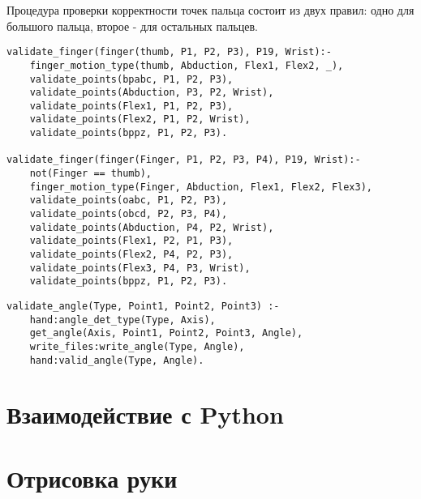 Процедура проверки корректности точек пальца состоит из двух правил: одно для большого пальца, второе - для остальных пальцев.
\begin{lstlisting}[caption=Процедура проверки корректности точек пальца, label=list:validate_finger]
validate_finger(finger(thumb, P1, P2, P3), P19, Wrist):-
	finger_motion_type(thumb, Abduction, Flex1, Flex2, _),
	validate_points(bpabc, P1, P2, P3),
	validate_points(Abduction, P3, P2, Wrist),
	validate_points(Flex1, P1, P2, P3),
	validate_points(Flex2, P1, P2, Wrist),
	validate_points(bppz, P1, P2, P3).
	
validate_finger(finger(Finger, P1, P2, P3, P4), P19, Wrist):-
	not(Finger == thumb),
	finger_motion_type(Finger, Abduction, Flex1, Flex2, Flex3),
	validate_points(oabc, P1, P2, P3),
	validate_points(obcd, P2, P3, P4),
	validate_points(Abduction, P4, P2, Wrist),
	validate_points(Flex1, P2, P1, P3),
	validate_points(Flex2, P4, P2, P3),
	validate_points(Flex3, P4, P3, Wrist),
	validate_points(bppz, P1, P2, P3).
\end{lstlisting}

\begin{lstlisting}[caption=Процедура проверки угла между точками на корректность, label=list:validate_angle]
validate_angle(Type, Point1, Point2, Point3) :-
	hand:angle_det_type(Type, Axis),
	get_angle(Axis, Point1, Point2, Point3, Angle),
	write_files:write_angle(Type, Angle),
	hand:valid_angle(Type, Angle).
\end{lstlisting}

\section{Взаимодействие с Python}


\section{Отрисовка руки}

